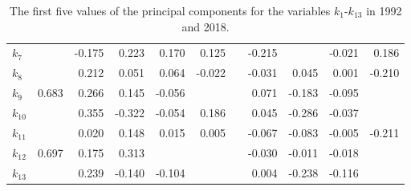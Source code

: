\begin{table}[htb]
\begin{tabular}{ lrrrrr|rrrrr }
		$k_{7}$  & \color{red}{0.903}                                & -0.175                                           & 0.223               & 0.170               & 0.125               & \color{red}{-0.757} & -0.215              & \color{red}{0.397}  & -0.021              & 0.186               \\
		$k_{8}$  & \color{red}{0.935}                                & 0.212                                            & 0.051               & 0.064               & -0.022              & \color{red}{-0.936} & -0.031              & 0.045               & 0.001               & -0.210              \\
		$k_{9}$  & 0.683                                             & 0.266                                            & 0.145               & -0.056              & \color{red}{-0.546} & \color{red}{-0.832} & 0.071               & -0.183              & -0.095              & \color{red}{-0.342} \\
		$k_{10}$ & \color{red}{0.806}                                & 0.355                                            & -0.322              & -0.054              & 0.186               & \color{red}{-0.841} & 0.045               & -0.286              & -0.037              & \color{red}{0.366}  \\
		$k_{11}$ & \color{red}{0.947}                                & 0.020                                            & 0.148               & 0.015               & 0.005               & \color{red}{-0.900} & -0.067              & -0.083              & -0.005              & -0.211              \\
		$k_{12}$ & 0.697                                             & 0.175                                            & 0.313               & \color{red}{-0.433} & \color{red}{-0.323} & \color{red}{-0.871} & -0.030              & -0.011              & -0.018              & \color{red}{-0.395} \\
		$k_{13}$ & \color{red}{0.798}                                & 0.239                                            & -0.140              & -0.104              & \color{red}{0.337}  & \color{red}{-0.783} & 0.004               & -0.238              & -0.116              & \color{red}{0.517}  \\
		\bottomrule
	\end{tabular}
	\caption{The first five values of the principal components for the variables $k_{1}$-$k_{13}$ in 1992 and 2018.}
	\label{table:4}
\end{table}

